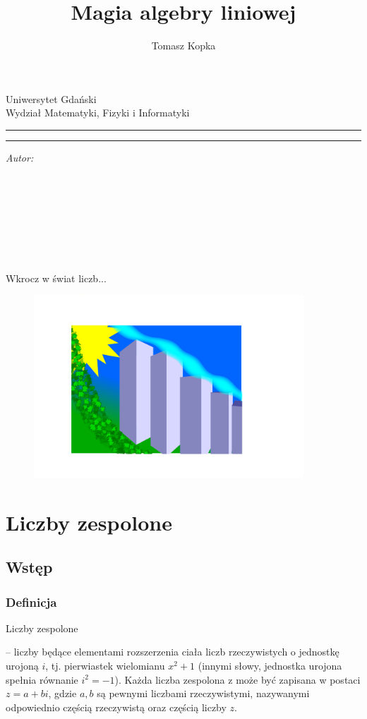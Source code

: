 \documentclass[12pt, a4paper]{article}
\author{Tomasz Kopka }
\title{Magia algebry liniowej}
\makeatletter
\newcommand{\linia}{\rule{\linewidth}{0.4mm}}
\renewcommand{\maketitle}{\begin{titlepage}

    \vspace*{1cm}
    \begin{center}\small
    Uniwersytet Gdański\\
    Wydział Matematyki, Fizyki i Informatyki
    \end{center}
    \vspace{3cm}
    \noindent\linia
    \begin{center}
      \huge \textsc{\@title}
         \end{center}
     \linia
    \vspace{0.5cm}

    \begin{flushright}
    \begin{minipage}{9cm}
    \textit{\large Autor:}\\
    \normalsize \textsc{\@author} \par
    \end{minipage}
    \vspace{5cm}\\\\\\\\\\\\\\
			\small Wkrocz w świat liczb...\\
     \end{flushright}
    \vspace*{\stretch{6}}
    \begin{center}
    \@date
    \end{center}
  \end{titlepage}
}
\makeatother
\begin{document}
\maketitle
    \vspace*{1cm}
\tableofcontents

\begin{figure}
	\centering
		\includegraphics[width=0.90\textwidth]{Rysunek.pdf}
	\label{fig:Rysunek}
\end{figure}

\newpage
\section{Liczby zespolone}
\label{sec:Liczbyzespolone}
\subsection{Wstęp}
\label{sec:Wstep}

\subsubsection{Definicja}
\label{sec:Definicja}


\begin{center}\large {Liczby zespolone}
\end{center}
– liczby będące elementami rozszerzenia ciała liczb rzeczywistych o jednostkę urojoną $i$, tj. pierwiastek wielomianu $x^2+1$ (innymi słowy, jednostka urojona spełnia równanie $i^2 = -1$). Każda liczba zespolona z może być zapisana w postaci $z=a + bi$, gdzie $a, b$ są pewnymi liczbami rzeczywistymi, nazywanymi odpowiednio częścią rzeczywistą oraz częścią liczby $z$.
\cite{przypis}

\vspace{1cm}
\end{document}

